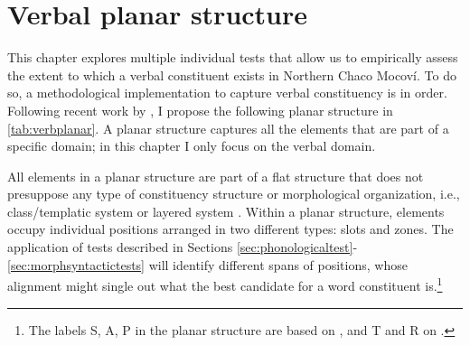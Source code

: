 \documentclass[output=paper]{langscibook}
\begin{document}

\section{Verbal planar structure}
\label{sec:Planarstructure}
This chapter explores multiple individual tests that allow us to empirically assess the extent to which a verbal constituent exists in Northern Chaco Mocoví. To do so, a methodological implementation to capture verbal constituency is in order. Following recent work by \citet{Tallman2020,Tallman2021}, I propose the following planar structure in \autoref{tab:verbplanar}. A planar structure captures all the elements that are part of a specific domain; in this chapter I only focus on the verbal domain. 

All elements in a planar structure are part of a flat structure that does not presuppose any type of constituency structure or morphological organization, i.e., class/templatic system or layered system  \citep[for a recent overview of these morphological systems, see][]{Mithun2016}. Within a planar structure, elements occupy individual positions arranged in two different types: slots and zones. The application of tests described in Sections \ref{sec:phonologicaltest}-\ref{sec:morphsyntactictests} will identify different spans of positions, whose alignment might single out what the best candidate for a word constituent is.\footnote{The labels S, A, P in the planar structure are based on \citet {Comrie1981}, and T and R on \citet{Malchukov2010}.}
  
\end{document}
